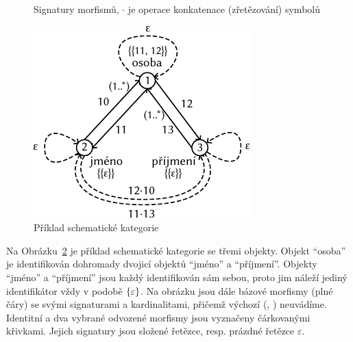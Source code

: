 \begin{figure}[!htb]
  \centering
  \caption{Signatury morfismů, $\cdot$ je operace konkatenace (zřetězování) symbolů}
  \label{fig:morphism-signatures}
\end{figure}

\begin{figure}[!htb]
  \centering
  \includegraphics[width=\maxwidth{\textwidth}]{../img/schemcat-diagrams/raw-schemcat-example.pdf}
  \caption{Příklad schematické kategorie}
  \label{fig:raw-schemcat}
\end{figure}

Na Obrázku~\ref{fig:raw-schemcat} je příklad schematické kategorie se třemi objekty.
Objekt \enquote{osoba} je identifikován dohromady dvojicí objektů \enquote{jméno} a \enquote{příjmení}.
Objekty \enquote{jméno} a \enquote{příjmení} jsou každý identifikován sám sebou, proto jim náleží jediný identifikátor vždy v podobě $\left\{\varepsilon\right\}$.
Na obrázku jsou dále bázové morfismy (plné čáry) se svými signaturami a kardinalitami, přičemž výchozí (\one{}, \one{}) neuvádíme.
Identitní a dva vybrané odvozené morfismy jsou vyznačeny čárkovanými křivkami.
Jejich signatury jsou složené řetězce, resp. prázdné řetězce $\varepsilon$.

